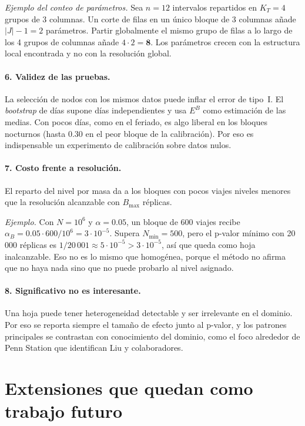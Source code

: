 \documentclass[11pt,a4paper]{article}
\begin{document}
\emph{Ejemplo del conteo de parámetros.} Sea $n=12$ intervalos repartidos en $K_T=4$
grupos de 3 columnas. Un corte de filas en un único bloque de 3 columnas añade
$|J|-1=2$ parámetros. Partir globalmente el mismo grupo de filas a lo largo de los 4
grupos de columnas añade $4\cdot2=\mathbf{8}$. Los parámetros crecen con la estructura
local encontrada y no con la resolución global.

\paragraph{6. Validez de las pruebas.} La selección de nodos con los mismos datos puede
inflar el error de tipo~I. El \emph{bootstrap} de días supone días independientes y usa
$E^B$ como estimación de las medias. Con pocos días, como en el feriado, es algo liberal
en los bloques nocturnos (hasta 0.30 en el peor bloque de la calibración). Por eso es
indispensable un experimento de calibración sobre datos nulos.

\paragraph{7. Costo frente a resolución.} El reparto del nivel por masa da a los
bloques con pocos viajes niveles menores que la resolución alcanzable con $B_{\max}$
réplicas.

\emph{Ejemplo.} Con $N=10^6$ y $\alpha=0.05$, un bloque de 600 viajes recibe
$\alpha_B=0.05\cdot600/10^6=3\cdot10^{-5}$. Supera $N_{\min}=500$, pero el p-valor
mínimo con 20\,000 réplicas es $1/20\,001\approx5\cdot10^{-5}>3\cdot10^{-5}$, así que
queda como hoja inalcanzable. Eso no es lo mismo que homogénea, porque el método no
afirma que no haya nada sino que no puede probarlo al nivel asignado.

\paragraph{8. Significativo no es interesante.} Una hoja puede tener heterogeneidad
detectable y ser irrelevante en el dominio. Por eso se reporta siempre el tamaño de
efecto junto al p-valor, y los patrones principales se contrastan con conocimiento del
dominio, como el foco alrededor de Penn Station que identifican Liu y colaboradores.

\section{Extensiones que quedan como trabajo futuro}
\end{document}
